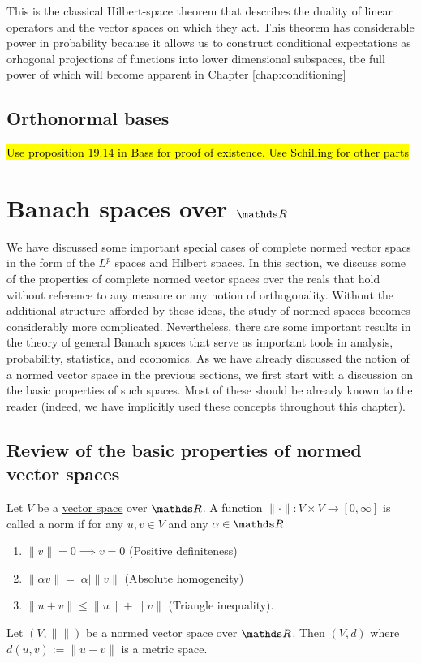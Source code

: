 This is the classical Hilbert-space theorem that describes the duality
of linear operators and the vector spaces on which they act. This
theorem has considerable power in probability because it allows us
to construct conditional expectations as orhogonal projections of
functions into lower dimensional subspaces, tbe full power of which
will become apparent in Chapter \ref{chap:conditioning}

\subsection{Orthonormal bases}

\hl{Use proposition 19.14 in Bass for proof of existence. Use Schilling for other parts}

\section{Banach spaces over $\protect\R$\label{sec:banach-R}}

We have discussed some important special cases of complete normed
vector spacs in the form of the $L^{p}$ spaces and Hilbert spaces.
In this section, we discuss some of the properties of complete normed
vector spaces over the reals that hold without reference to any measure
or any notion of orthogonality. Without the additional structure afforded
by these ideas, the study of normed spaces becomes considerably more
complicated. Nevertheless, there are some important results in the
theory of general Banach spaces that serve as important tools in analysis,
probability, statistics, and economics. As we have already discussed
the notion of a normed vector space in the previous sections, we first
start with a discussion on the basic properties of such spaces. Most
of these should be already known to the reader (indeed, we have implicitly
used these concepts throughout this chapter).

\subsection{Review of the basic properties of normed vector spaces}
\begin{defn}
\label{def:normedVectorSpace}Let $V$ be a \hyperref[def:vectorSpace]{vector space}
over $\R$. A function $\lVert\cdot\rVert:V\times V\to\left[0,\infty\right]$
is called a norm if for any $u,v\in V$ and any $\alpha\in\R$
\end{defn}

\begin{enumerate}
\item $\lVert v\rVert=0\implies v=0$ (Positive definiteness)
\item $\lVert\alpha v\rVert=\lvert\alpha\rvert\lVert v\rVert$ (Absolute
homogeneity)
\item $\lVert u+v\rVert\leq\lVert u\rVert+\lVert v\rVert$ (Triangle inequality).
\end{enumerate}
\begin{prop}
\label{prop:normMetric}Let $\left(V,\lVert\rVert\right)$ be a normed
vector space over $\R$. Then $\left(V,d\right)$ where $d\left(u,v\right):=\lVert u-v\rVert$
is a metric space.
\end{prop}


